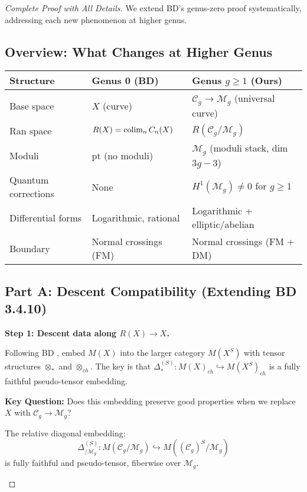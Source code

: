 \begin{proof}[Complete Proof with All Details]

We extend BD's genus-zero proof systematically, addressing each new phenomenon at higher genus.

\subsection*{Overview: What Changes at Higher Genus}

\begin{center}
\begin{tabular}{|l|p{5cm}|p{5cm}|}
\hline
\textbf{Structure} & \textbf{Genus 0 (BD)} & \textbf{Genus $g \geq 1$ (Ours)} \\
\hline
Base space & $X$ (curve) & $\mathcal{C}_g \to \mathcal{M}_g$ (universal curve) \\
\hline
Ran space & $R(X) = \operatorname{colim}_n C_n(X)$ & $R(\mathcal{C}_g/\mathcal{M}_g)$ \\
\hline
Moduli & $\text{pt}$ (no moduli) & $\mathcal{M}_g$ (moduli stack, dim $3g-3$) \\
\hline
Quantum corrections & None & $H^1(\mathcal{M}_g) \neq 0$ for $g \geq 1$ \\
\hline
Differential forms & Logarithmic, rational & Logarithmic + elliptic/abelian \\
\hline
Boundary & Normal crossings (FM) & Normal crossings (FM + DM) \\
\hline
\end{tabular}
\end{center}

\subsection*{Part A: Descent Compatibility (Extending BD 3.4.10)}

\textbf{Step 1: Descent data along $R(X) \to X$.}

Following BD \cite[§3.4.10-3.4.11]{BD04}, embed $M(X)$ into the larger category 
$M(X^S)$ with tensor structures $\otimes_*$ and $\otimes_{ch}$. The key is that 
$\Delta^{(S)}_*: M(X)_{ch} \hookrightarrow M(X^S)_{ch}$ is a fully faithful 
pseudo-tensor embedding.

\textbf{Key Question:} Does this embedding preserve good properties when we replace $X$ with $\mathcal{C}_g \to \mathcal{M}_g$?

\begin{lemma}\label{lem:relative-diagonal}
The relative diagonal embedding:
$$\Delta^{(S)}_{/\mathcal{M}_g}: M(\mathcal{C}_g/\mathcal{M}_g) \hookrightarrow M((\mathcal{C}_g)^S/\mathcal{M}_g)$$
is fully faithful and pseudo-tensor, fiberwise over $\mathcal{M}_g$.
\end{lemma}


\end{proof}
